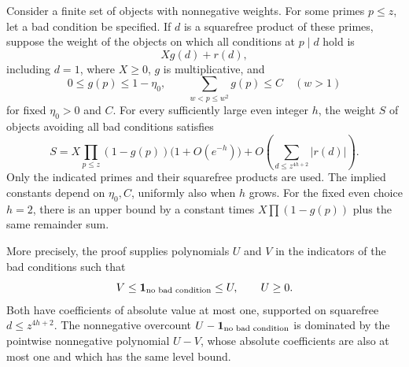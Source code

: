 \begin{lemma}\label{lem:sieve}
Consider a finite set of objects with nonnegative weights. For some
primes $p\le z$, let a bad condition be specified. If $d$ is a
squarefree product of these primes, suppose the weight of the objects
on which all conditions at $p\mid d$ hold is
\[
 Xg(d)+r(d),
\]
including $d=1$, where $X\ge0$, $g$ is multiplicative, and
\begin{equation}\label{eq:sieve-density-hypotheses}
 0\le g(p)\le1-\eta_0,\qquad
 \sum_{w<p\le w^2}g(p)\le C\quad(w>1)
\end{equation}
for fixed $\eta_0>0$ and $C$.
For every sufficiently large even integer $h$, the weight $S$ of
objects avoiding all bad conditions satisfies
\begin{equation}\label{eq:block-sieve}
 S=X\prod_{p\le z}(1-g(p))\bigl(1+O(e^{-h})\bigr)
   +O\!\left(\sum_{d\le z^{4h+2}}|r(d)|\right).
\end{equation}
Only the indicated primes and their squarefree products are used.
The implied constants depend on $\eta_0,C$, uniformly also when $h$
grows. For the fixed even choice $h=2$, there is an upper bound by
a constant times $X\prod(1-g(p))$ plus the same remainder sum.

More precisely, the proof supplies polynomials $U$ and $V$ in the
indicators of the bad conditions such that
\[
 V\le\mathbf 1_{\text{no bad condition}}\le U,\qquad U\ge0.
\]
Both have coefficients of absolute value at most one, supported on
squarefree $d\le z^{4h+2}$. The nonnegative overcount
$U-\mathbf 1_{\text{no bad condition}}$ is dominated by the pointwise
nonnegative polynomial $U-V$, whose absolute coefficients are also
at most one and which has the same level bound.
\end{lemma}

